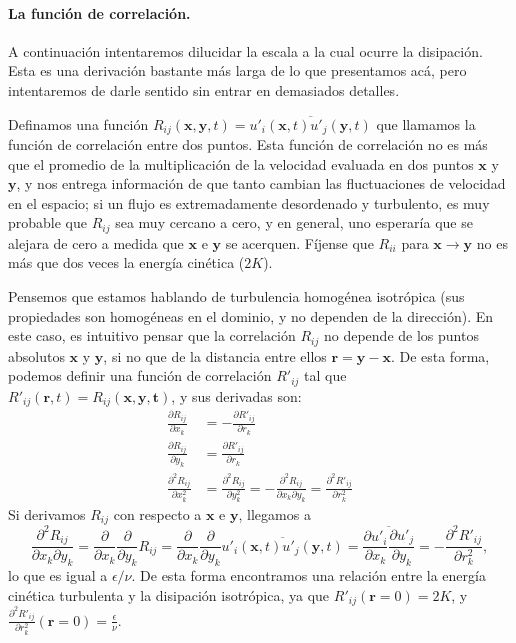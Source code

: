 \paragraph*{La función de correlación.}
A continuación intentaremos dilucidar la escala a la cual ocurre la disipación.
Esta es una derivación bastante más larga de lo que presentamos acá, pero intentaremos de darle sentido sin entrar en demasiados detalles.

Definamos una función $R_{ij}(\mathbf{x},\mathbf{y},t) = \overline{u'_i(\mathbf{x},t)u'_j(\mathbf{y},t)}$ que llamamos la función de correlación entre dos puntos.
Esta función de correlación no es más que el promedio de la multiplicación de la velocidad evaluada en dos puntos $\mathbf{x}$ y $\mathbf{y}$, y nos entrega información de que tanto cambian las fluctuaciones de velocidad en el espacio; si un flujo es extremadamente desordenado y turbulento, es muy probable que $R_{ij}$ sea muy cercano a cero, y en general, uno esperaría que se alejara de cero a medida que $\mathbf{x}$ e $\mathbf{y}$ se acerquen.
Fíjense que $R_{ii}$ para $\mathbf{x}\to\mathbf{y}$ no es más que dos veces la energía cinética ($2K$).

Pensemos que estamos hablando de turbulencia homogénea isotrópica (sus propiedades son homogéneas en el dominio, y no dependen de la dirección).
En este caso, es intuitivo pensar que la correlación $R_{ij}$ no depende de los puntos absolutos $\mathbf{x}$ y $\mathbf{y}$, si no que de la distancia entre ellos $\mathbf{r} = \mathbf{y}-\mathbf{x}$.
De esta forma, podemos definir una función de correlación $R'_{ij}$ tal que $R'_{ij}(\mathbf{r},t) = R_{ij}(\mathbf{x},\mathbf{y},\mathbf{t})$, y sus derivadas son:
%
\begin{align}
\frac{\partial R_{ij}}{\partial x_k} &= -\frac{\partial R'_{ij}}{\partial r_k} \nonumber \\
\frac{\partial R_{ij}}{\partial y_k} &= \frac{\partial R'_{ij}}{\partial r_k} \nonumber\\
\frac{\partial^2 R_{ij}}{\partial x_k^2} &= \frac{\partial^2 R_{ij}}{\partial y_k^2} = -\frac{\partial^2 R_{ij}}{\partial x_k\partial y_k} = \frac{\partial^2 R'_{ij}}{\partial r_k^2} 
\end{align}
%
Si derivamos $R_{ij}$ con respecto a $\mathbf{x}$ e $\mathbf{y}$, llegamos a
%
\begin{equation}
\frac{\partial^2R_{ij}}{\partial x_k\partial y_k} = \frac{\partial}{\partial x_k}\frac{\partial}{\partial y_k} R_{ij} =\frac{\partial}{\partial x_k}\frac{\partial}{\partial y_k} \overline{u'_i(\mathbf{x},t)u'_j(\mathbf{y},t)} = \overline{\frac{\partial u'_i}{\partial x_k}\frac{\partial u'_j}{\partial y_k}} = -\frac{\partial^2 R'_{ij}}{\partial r_k^2},
\end{equation}
%
lo que es igual a $\epsilon/\nu$.
De esta forma encontramos una relación entre la energía cinética turbulenta y la disipación isotrópica, ya que $R'_{ij}(\mathbf{r}=0) = 2K$, y $\frac{\partial^2 R'_{ij}}{\partial r_k^2}(\mathbf{r}=0) = \frac{\epsilon}{\nu}$.

